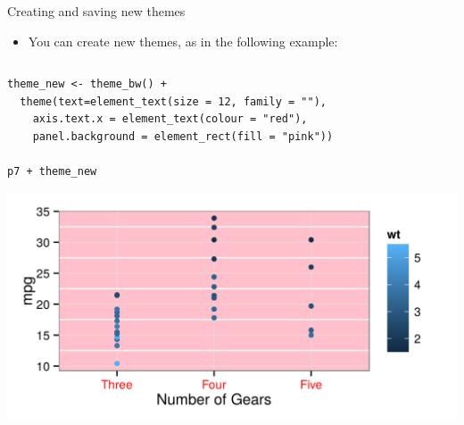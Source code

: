 \documentclass[table,smaller]{beamer}
\begin{document}
\begin{frame}[fragile,label=sec-6-3]{Creating and saving new themes}
 \begin{itemize}
\item You can create new themes, as in the following example:
\end{itemize}

\begin{columns}  \begin{block}{}

\begin{verbatim}
theme_new <- theme_bw() +
  theme(text=element_text(size = 12, family = ""),
	axis.text.x = element_text(colour = "red"),
	panel.background = element_rect(fill = "pink"))

p7 + theme_new
\end{verbatim}

\includegraphics[width=.9\linewidth]{images/themes.png}

\end{block} \end{columns}
\end{frame}
\end{document}
